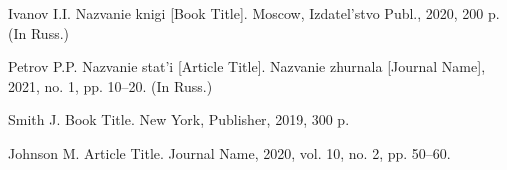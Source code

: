 \documentclass[12pt]{article}
\begin{document}



\begin{bibliolist}
\item Ivanov I.I. Nazvanie knigi [Book Title]. Moscow, Izdatel'stvo Publ., 2020, 200 p. (In Russ.)
\item Petrov P.P. Nazvanie stat'i [Article Title]. Nazvanie zhurnala [Journal Name], 2021, no. 1, pp. 10--20. (In Russ.)
\item Smith J. Book Title. New York, Publisher, 2019, 300 p.
\item Johnson M. Article Title. Journal Name, 2020, vol. 10, no. 2, pp. 50--60.
\end{bibliolist}
\end{document}
